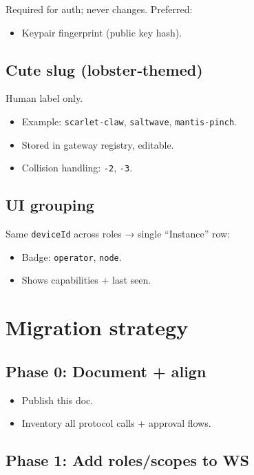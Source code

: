 Required for auth; never changes.
Preferred:

\begin{itemize}
  \item Keypair fingerprint (public key hash).
\end{itemize}


\subsection{Cute slug (lobster‑themed)}


Human label only.

\begin{itemize}
  \item Example: \texttt{scarlet-claw}, \texttt{saltwave}, \texttt{mantis-pinch}.
  \item Stored in gateway registry, editable.
  \item Collision handling: \texttt{-2}, \texttt{-3}.
\end{itemize}


\subsection{UI grouping}


Same \texttt{deviceId} across roles → single “Instance” row:

\begin{itemize}
  \item Badge: \texttt{operator}, \texttt{node}.
  \item Shows capabilities + last seen.
\end{itemize}


\hrulefill


\section{Migration strategy}


\subsection{Phase 0: Document + align}


\begin{itemize}
  \item Publish this doc.
  \item Inventory all protocol calls + approval flows.
\end{itemize}


\subsection{Phase 1: Add roles/scopes to WS}


